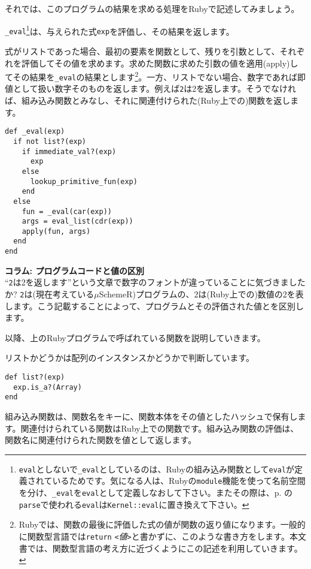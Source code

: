 それでは、このプログラムの結果を求める処理をRubyで記述してみましょう。

{\tt \_eval}\footnote{{\tt eval}としないで{\tt \_eval}としているのは、Rubyの組み込み関数として{\tt eval}が定義されているためです。気になる人は、Rubyの{\tt module}機能を使って名前空間を分け、{\tt \_eval}を{\tt eval}として定義しなおして下さい。またその際は、p. \pageref{fun:parse}の{\tt parse}で使われる{\tt eval}は{\tt Kernel::eval}に置き換えて下さい。}は、与えられた式{\tt exp}を評価し、その結果を返します。

式がリストであった場合、最初の要素を関数として、残りを引数として、それぞれを評価してその値を求めます。求めた関数に求めた引数の値を適用(apply)してその結果を{\tt \_eval}の結果とします\footnote{Rubyでは、関数の最後に評価した式の値が関数の返り値になります。一般的に関数型言語では{\tt return} {\it {\tt <}値{\tt >}}と書かずに、このような書き方をします。本文書では、関数型言語の考え方に近づくようにこの記述を利用していきます。}。一方、リストでない場合、数字であれば即値として扱い数字そのものを返します。例えば{\tt 2}は2を返します。そうでなければ、組み込み関数とみなし、それに関連付けられた(Ruby上での)関数を返します。

\begin{lstlisting}
def _eval(exp)
  if not list?(exp) 
    if immediate_val?(exp)
      exp
    else 
      lookup_primitive_fun(exp)
    end
  else
    fun = _eval(car(exp))
    args = eval_list(cdr(exp))
    apply(fun, args)
  end
end
\end{lstlisting}

\begin{boxnote}
{\bf コラム: プログラムコードと値の区別} \\

“{\tt 2}は2を返します”という文章で数字のフォントが違っていることに気づきましたか? {\tt 2}は(現在考えている$\mu$SchemeR)プログラムの、2は(Ruby上での)数値の2を表します。こう記載することによって、プログラムとその評価された値とを区別します。
\end{boxnote}

以降、上のRubyプログラムで呼ばれている関数を説明していきます。

リストかどうかは配列のインスタンスかどうかで判断しています。

\begin{lstlisting}
def list?(exp)
  exp.is_a?(Array)
end
\end{lstlisting}

組み込み関数は、関数名をキーに、関数本体をその値としたハッシュで保有しま
す。関連付けられている関数はRuby上での関数です。組み込み関数の評価は、
関数名に関連付けられた関数を値として返します。

